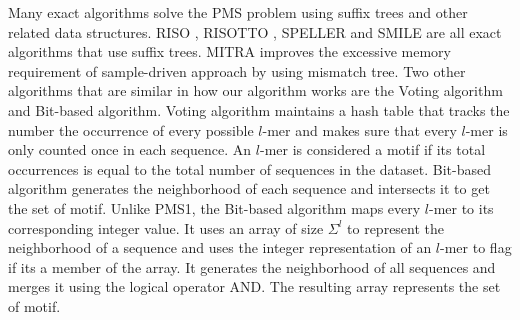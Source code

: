	Many exact algorithms solve the PMS problem using suffix trees and other related data structures. RISO \cite{Carvalho05ahighly}, RISOTTO \cite{Pisanti06risotto}, SPELLER \cite{Sagot98spellingapproximate} and SMILE are all exact algorithms that use suffix trees. MITRA \cite{eskin2002finding} improves the excessive memory requirement of sample-driven approach by using mismatch tree. Two other algorithms that are similar in how our algorithm works are the Voting algorithm and Bit-based algorithm. Voting algorithm \cite{Chin2005} maintains a hash table that tracks the number the occurrence of every possible $l$-mer and makes sure that every $l$-mer is only counted once in each sequence. An $l$-mer is considered a motif if its total occurrences is equal to the total number of sequences in the dataset. Bit-based algorithm \cite{dasari2010efficient} generates the neighborhood of each sequence and intersects it to get the set of motif. Unlike PMS1, the Bit-based algorithm maps every $l$-mer to its corresponding integer value. It uses an array of size $\Sigma^l$ to represent the neighborhood of a sequence and uses the integer representation of an $l$-mer to flag if its a member of the array. It generates the neighborhood of all sequences and merges it using the logical operator AND. The resulting array represents the set of motif.

